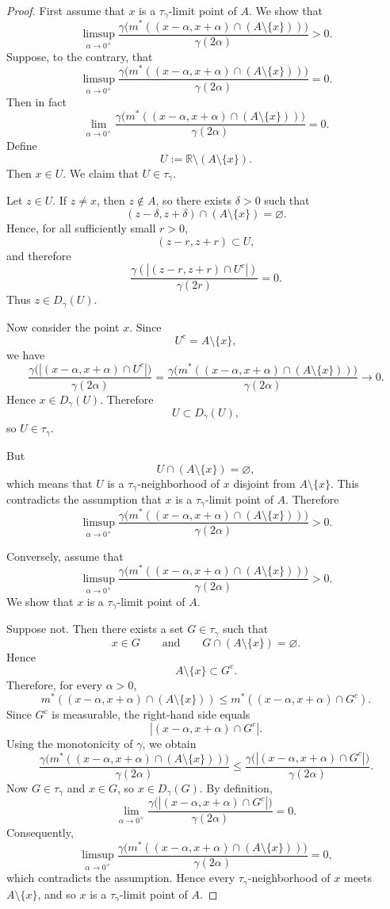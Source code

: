 \documentclass{amsart}
\theoremstyle{plain}
\numberwithin{equation}{section}
\begin{document}
\begin{proof}
First assume that $x$ is a $\tau_{\gamma}$-limit point of $A$. We show that
$$
\limsup_{\alpha \to 0^+}
\frac{\gamma\bigl(m^*((x-\alpha,x+\alpha)\cap (A\setminus\{x\}))\bigr)}{\gamma(2\alpha)}
>0.
$$
Suppose, to the contrary, that
$$
\limsup_{\alpha \to 0^+}
\frac{\gamma\bigl(m^*((x-\alpha,x+\alpha)\cap (A\setminus\{x\}))\bigr)}{\gamma(2\alpha)}
=0.
$$
Then in fact
$$
\lim_{\alpha \to 0^+}
\frac{\gamma\bigl(m^*((x-\alpha,x+\alpha)\cap (A\setminus\{x\}))\bigr)}{\gamma(2\alpha)}
=0.
$$
Define
$$
U:=\mathbb{R}\setminus (A\setminus\{x\}).
$$
Then $x\in U$. We claim that $U\in\tau_{\gamma}$.

Let $z\in U$. If $z\neq x$, then $z\notin A$, so there exists $\delta>0$ such that
$$
(z-\delta,z+\delta)\cap (A\setminus\{x\})=\varnothing.
$$
Hence, for all sufficiently small $r>0$,
$$
(z-r,z+r)\subset U,
$$
and therefore
$$
\frac{\gamma(|(z-r,z+r)\cap U^c|)}{\gamma(2r)}=0.
$$
Thus $z\in D_{\gamma}(U)$.

Now consider the point $x$. Since
$$
U^c=A\setminus\{x\},
$$
we have
$$
\frac{\gamma\bigl(|(x-\alpha,x+\alpha)\cap U^c|\bigr)}{\gamma(2\alpha)}
=
\frac{\gamma\bigl(m^*((x-\alpha,x+\alpha)\cap (A\setminus\{x\}))\bigr)}{\gamma(2\alpha)}
\to 0.
$$
Hence $x\in D_{\gamma}(U)$. Therefore
$$
U\subset D_{\gamma}(U),
$$
so $U\in\tau_{\gamma}$.

But
$$
U\cap (A\setminus\{x\})=\varnothing,
$$
which means that $U$ is a $\tau_{\gamma}$-neighborhood of $x$ disjoint from $A\setminus\{x\}$. This contradicts the assumption that $x$ is a $\tau_{\gamma}$-limit point of $A$. Therefore
$$
\limsup_{\alpha \to 0^+}
\frac{\gamma\bigl(m^*((x-\alpha,x+\alpha)\cap (A\setminus\{x\}))\bigr)}{\gamma(2\alpha)}
>0.
$$

Conversely, assume that
$$
\limsup_{\alpha \to 0^+}
\frac{\gamma\bigl(m^*((x-\alpha,x+\alpha)\cap (A\setminus\{x\}))\bigr)}{\gamma(2\alpha)}
>0.
$$
We show that $x$ is a $\tau_{\gamma}$-limit point of $A$.

Suppose not. Then there exists a set $G\in\tau_{\gamma}$ such that
$$
x\in G
\qquad\text{and}\qquad
G\cap (A\setminus\{x\})=\varnothing.
$$
Hence
$$
A\setminus\{x\}\subset G^c.
$$
Therefore, for every $\alpha>0$,
$$
m^*((x-\alpha,x+\alpha)\cap (A\setminus\{x\}))
\le
m^*((x-\alpha,x+\alpha)\cap G^c).
$$
Since $G^c$ is measurable, the right-hand side equals
$$
|(x-\alpha,x+\alpha)\cap G^c|.
$$
Using the monotonicity of $\gamma$, we obtain
$$
\frac{\gamma\bigl(m^*((x-\alpha,x+\alpha)\cap (A\setminus\{x\}))\bigr)}{\gamma(2\alpha)}
\le
\frac{\gamma\bigl(|(x-\alpha,x+\alpha)\cap G^c|\bigr)}{\gamma(2\alpha)}.
$$
Now $G\in\tau_{\gamma}$ and $x\in G$, so $x\in D_{\gamma}(G)$. By definition,
$$
\lim_{\alpha\to 0^+}
\frac{\gamma\bigl(|(x-\alpha,x+\alpha)\cap G^c|\bigr)}{\gamma(2\alpha)}
=0.
$$
Consequently,
$$
\limsup_{\alpha \to 0^+}
\frac{\gamma\bigl(m^*((x-\alpha,x+\alpha)\cap (A\setminus\{x\}))\bigr)}{\gamma(2\alpha)}
=0,
$$
which contradicts the assumption. Hence every $\tau_{\gamma}$-neighborhood of $x$ meets $A\setminus\{x\}$, and so $x$ is a $\tau_{\gamma}$-limit point of $A$.
\end{proof}
\end{document}
